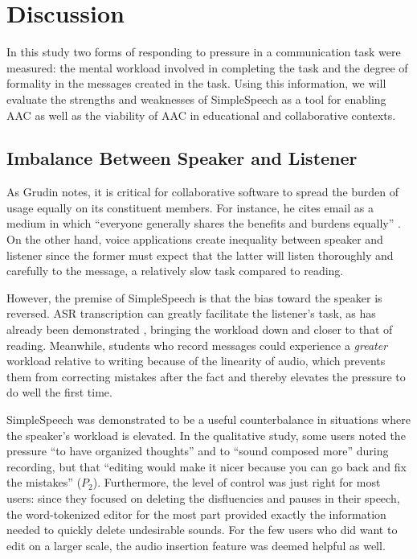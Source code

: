 \section{Discussion}
In this study two forms of responding to pressure in a communication task were measured: the mental workload involved in completing the task and the degree of formality in the messages created in the task.
Using this information, we will evaluate the strengths and weaknesses of SimpleSpeech as a tool for enabling AAC as well as the viability of AAC in educational and collaborative contexts.

\subsection{Imbalance Between Speaker and Listener}
As Grudin notes, it is critical for collaborative software to spread the burden of usage equally on its constituent members. 
For instance, he cites email as a medium in which ``everyone generally shares the benefits and burdens equally'' \cite{grudin}. 
On the other hand, voice applications create inequality between speaker and listener since the former must expect that the latter will listen thoroughly and carefully to the message, a relatively slow task compared to reading.

However, the premise of SimpleSpeech is that the bias toward the speaker is reversed. 
ASR transcription can greatly facilitate the listener's task, as has already been demonstrated \cite{whittaker,vemuri}, bringing the workload down and closer to that of reading. 
Meanwhile, students who record messages could experience a \textit{greater} workload relative to writing because of the linearity of audio, which prevents them from correcting mistakes after the fact and thereby elevates the pressure to do well the first time.

SimpleSpeech was demonstrated to be a useful counterbalance in situations where the speaker's workload is elevated. 
In the qualitative study, some users noted the pressure ``to have organized thoughts'' and to ``sound composed more'' during recording, but that ``editing would make it nicer because you can go back and fix the mistakes'' ($P_2$).
Furthermore, the level of control was just right for most users: since they focused on deleting the disfluencies and pauses in their speech, the word-tokenized editor for the most part provided exactly the information needed to quickly delete undesirable sounds.
For the few users who did want to edit on a larger scale, the audio insertion feature was deemed helpful as well.

